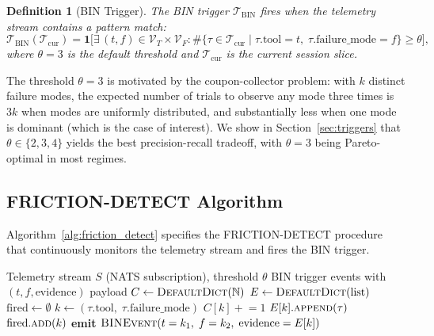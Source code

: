 \documentclass[11pt]{article}
\newtheorem{definition}{Definition}
\begin{document}
\begin{definition}[BIN Trigger]
\label{def:bin_trigger}
The BIN trigger $\mathcal{T}_{\text{BIN}}$ fires when the telemetry stream
contains a pattern match:
\begin{equation}
\mathcal{T}_{\text{BIN}}(\mathcal{T}_{\text{cur}}) = \mathbf{1}\bigl[
    \exists\, (t, f) \in \mathcal{V}_T \times \mathcal{V}_F :
    \#\{ \tau \in \mathcal{T}_{\text{cur}} \mid \tau.\text{tool}=t,\;
    \tau.\text{failure\_mode}=f \} \geq \theta
\bigr],
\end{equation}
where $\theta = 3$ is the default threshold and $\mathcal{T}_{\text{cur}}$
is the current session slice.
\end{definition}

The threshold $\theta = 3$ is motivated by the coupon-collector problem: with
$k$ distinct failure modes, the expected number of trials to observe any mode
three times is $3k$ when modes are uniformly distributed, and substantially
less when one mode is dominant (which is the case of interest). We show in
Section~\ref{sec:triggers} that $\theta \in \{2,3,4\}$ yields the best
precision-recall tradeoff, with $\theta = 3$ being Pareto-optimal in most
regimes.

\subsection{FRICTION-DETECT Algorithm}

Algorithm~\ref{alg:friction_detect} specifies the FRICTION-DETECT procedure
that continuously monitors the telemetry stream and fires the BIN trigger.

\begin{algorithm}[H]
\caption{FRICTION-DETECT$(S, \theta)$}
\label{alg:friction_detect}
\begin{algorithmic}[1]
\Require Telemetry stream $S$ (NATS subscription), threshold $\theta$
\Ensure BIN trigger events with $(t, f, \text{evidence})$ payload
\State $C \gets \textsc{DefaultDict}(\mathbb{N})$ 
\State $E \gets \textsc{DefaultDict}(\text{list})$ 
\State $\text{fired} \gets \emptyset$ 
        \State $k \gets (\tau.\text{tool},\; \tau.\text{failure\_mode})$
        \State $C[k] \mathrel{+}= 1$
        \State $E[k].\textsc{append}(\tau)$
            \State $\text{fired}.\textsc{add}(k)$
            \State \textbf{emit} $\textsc{BINEvent}(t=k_1,\; f=k_2,\; \text{evidence}=E[k])$
        \EndIf
    \EndIf
\EndFor
\end{algorithmic}
\end{algorithm}
\end{document}
